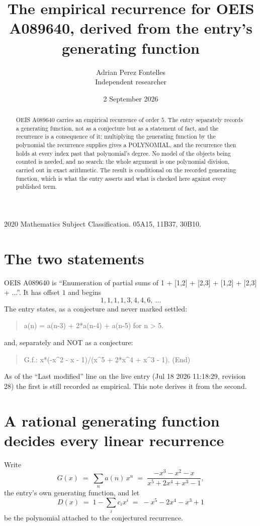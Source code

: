 \documentclass[11pt,a4paper]{article}
\title{The empirical recurrence for OEIS A089640, derived from the entry's generating function}
\author{Adrian Perez Fontelles\\ \small Independent researcher}
\date{2 September 2026}
\theoremstyle{plain}
\theoremstyle{definition}
\begin{document}
\maketitle

\begin{abstract}
OEIS A089640 carries an empirical recurrence of order $5$. The entry separately records a
generating function, not as a conjecture but as a statement of fact, and the recurrence is a
consequence of it: multiplying the generating function by the polynomial the recurrence
supplies gives a POLYNOMIAL, and the recurrence then holds at every index past that
polynomial's degree. No model of the objects being counted is needed, and no search: the
whole argument is one polynomial division, carried out in exact arithmetic. The result is
conditional on the recorded generating function, which is what the entry asserts and what is
checked here against every published term.
\end{abstract}

\noindent\small 2020 Mathematics Subject Classification. 05A15, 11B37, 30B10.\normalsize

\section{The two statements}

OEIS A089640 is ``Enumeration of partial sums of 1 + [1,2] + [2,3] + [1,2] + [2,3] + ...''. It has offset $1$ and begins
\[
1, 1, 1, 1, 3, 4, 4, 6,\ \dots
\]
The entry states, as a conjecture and never marked settled:
\begin{quote}
a(n) = a(n-3) + 2*a(n-4) + a(n-5) for n > 5.
\end{quote}
and, separately and NOT as a conjecture:
\begin{quote}
G.f.: x*(-x\^{}2 - x - 1)/(x\^{}5 + 2*x\^{}4 + x\^{}3 - 1). (End)
\end{quote}
As of the ``Last modified'' line on the live entry (Jul 18 2026 11:18:29, revision 28) the first is still
recorded as empirical. This note derives it from the second.

\section{A rational generating function decides every linear recurrence}

Write
\[
G(x)\;=\;\sum_{n}a(n)\,x^{n}\;=\;\frac{- x^{3} - x^{2} - x}{x^{5} + 2 x^{4} + x^{3} - 1},
\]
the entry's own generating function, and let
\[
D(x)\;=\;1-\sum_i c_i x^{i}\;=\;- x^{5} - 2 x^{4} - x^{3} + 1
\]
be the polynomial attached to the conjectured recurrence.
\end{document}
